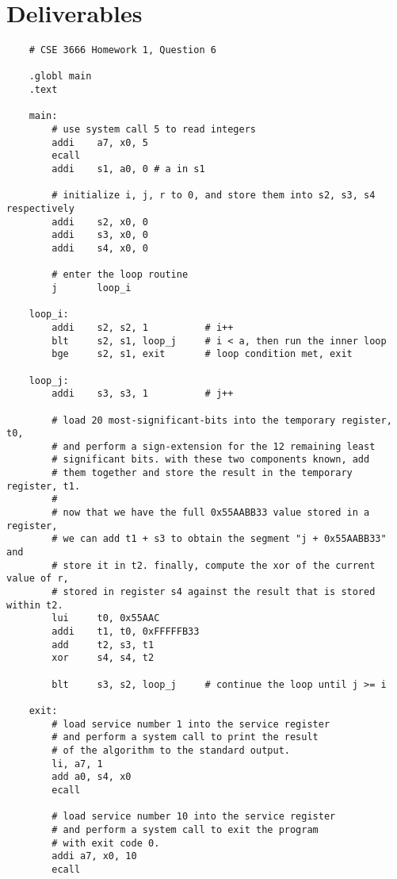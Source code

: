 \documentclass{article}
\begin{document}
\section{Deliverables}
    \begin{lstlisting}
    # CSE 3666 Homework 1, Question 6

    .globl main
    .text
    
    main:   
        # use system call 5 to read integers
        addi    a7, x0, 5
        ecall
        addi    s1, a0, 0 # a in s1
    
        # initialize i, j, r to 0, and store them into s2, s3, s4 respectively
        addi    s2, x0, 0
        addi    s3, x0, 0
        addi    s4, x0, 0 
        
        # enter the loop routine
        j       loop_i
            
    loop_i:
        addi    s2, s2, 1          # i++
        blt     s2, s1, loop_j     # i < a, then run the inner loop
        bge     s2, s1, exit       # loop condition met, exit
        
    loop_j:
        addi    s3, s3, 1          # j++
        
        # load 20 most-significant-bits into the temporary register, t0,
        # and perform a sign-extension for the 12 remaining least
        # significant bits. with these two components known, add
        # them together and store the result in the temporary register, t1.
        # 
        # now that we have the full 0x55AABB33 value stored in a register,
        # we can add t1 + s3 to obtain the segment "j + 0x55AABB33" and
        # store it in t2. finally, compute the xor of the current value of r,
        # stored in register s4 against the result that is stored within t2.
        lui     t0, 0x55AAC
        addi    t1, t0, 0xFFFFFB33
        add     t2, s3, t1
        xor     s4, s4, t2
    
        blt     s3, s2, loop_j     # continue the loop until j >= i
            
    exit:
        # load service number 1 into the service register
        # and perform a system call to print the result
        # of the algorithm to the standard output.
        li, a7, 1      
        add a0, s4, x0 
        ecall
        
        # load service number 10 into the service register
        # and perform a system call to exit the program
        # with exit code 0.
        addi a7, x0, 10
        ecall
    \end{lstlisting}
\end{document}
